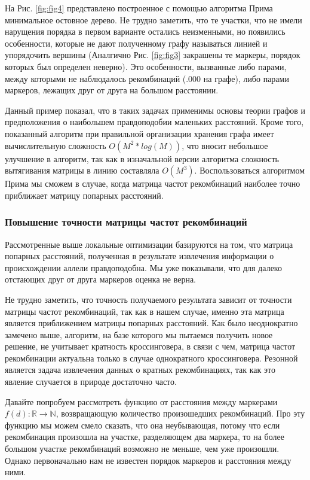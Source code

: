 \documentclass{matmex-diploma-custom}
\begin{document}
На Рис. \ref{fig:fig4} представлено построенное с помощью алгоритма
Прима минимальное остовное дерево. Не трудно заметить, что те участки,
что не имели нарущения порядка в первом варианте остались неизменными,
но появились особенности, которые не дают полученному графу называться
линией и упорядочить вершины (Аналгично Рис. \ref{fig:fig3} закрашены
те маркеры, порядок которых был определен неверно). Это особенности,
вызванные либо парами, между которыми не наблюдалось рекомбинаций
(.000 на графе), либо парами маркеров, лежащих друг от друга на
большом расстоянии.

Данный пример показал, что в таких задачах применимы основы теории
графов и предположения о наибольшем правдоподобии маленьких
расстояний. Кроме того, показанный алгоритм при правильной организации
хранения графа имеет вычислительную сложность $O(M^2*log(M))$, что
вносит небольшое улучшение в алгоритм, так как в изначальной версии
алгоритма сложность вытягивания матрицы в линию составляла
$O(M^3)$. Воспользоваться алгоритмом Прима мы сможем в случае, когда
матрица частот рекомбинаций наиболее точно приближает матрицу попарных
расстояний.

\subsubsection{Повышение точности матрицы частот рекомбинаций}

Рассмотренные выше локальные оптимизации базируются на том, что
матрица попарных расстояний, полученная в результате извлечения
информации о происхождении аллели правдоподобна. Мы уже показывали,
что для далеко отстающих друг от друга маркеров оценка не верна.

Не трудно заметить, что точность получаемого результата зависит от
точности матрицы частот рекомбинаций, так как в нашем случае, именно
эта матрица является приближением матрицы попарных расстояний.  Как
было неоднократно замечено выше, алгоритм, на базе которого мы
пытаемся получить новое решение, не учитывает кратность кроссинговера,
в связи с чем, матрица частот рекомбинации актуальна только в случае
однократного кроссинговера. Резонной является задача извлечения данных
о кратных рекомбинациях, так как это явление случается в природе
достаточно часто.

Давайте попробуем рассмотреть функцию от расстояния между маркерами
$f(d):\mathbb{R} \to \mathbb{N}$, возвращающую количество произошедших
рекомбинаций. Про эту функцию мы можем смело сказать, что она
неубывающая, потому что если рекомбинация произошла на участке,
разделяющем два маркера, то на более большом участке рекомбинаций
возможно не меньше, чем уже произошли. Однако первоначально нам не
известен порядок маркеров и расстояния между ними.
\end{document}
